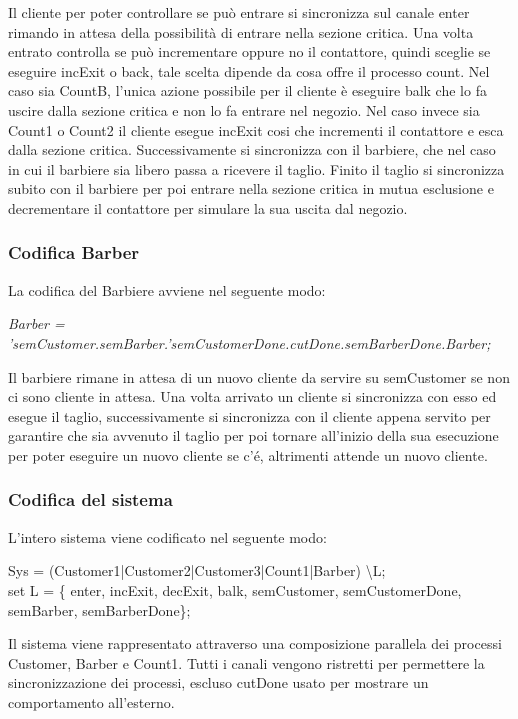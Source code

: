 Il cliente per poter controllare se può entrare si sincronizza sul canale enter rimando in attesa della possibilità di entrare nella sezione critica. Una volta entrato controlla se può incrementare oppure no il contattore, quindi sceglie se eseguire incExit o back, tale scelta dipende da cosa offre il processo count. Nel caso sia CountB, l'unica azione possibile per il cliente è eseguire balk che lo fa uscire dalla sezione critica e non lo fa entrare nel negozio. Nel caso invece sia Count1 o Count2 il cliente esegue incExit cosi che incrementi il contattore e esca dalla sezione critica. Successivamente si sincronizza con il barbiere, che nel caso in cui il barbiere sia libero passa a ricevere il taglio. Finito il taglio si sincronizza subito con il barbiere per poi entrare nella sezione critica in mutua esclusione e decrementare il contattore per simulare la sua uscita dal negozio.

\subsubsection{Codifica Barber}

La codifica del Barbiere avviene nel seguente modo:

\emph{Barber = 'semCustomer.semBarber.'semCustomerDone.cutDone.semBarberDone.Barber;}

Il barbiere rimane in attesa di un nuovo cliente da servire su semCustomer se non ci sono cliente in attesa. Una volta arrivato un cliente si sincronizza con esso ed esegue il taglio, successivamente si sincronizza con il cliente appena servito per garantire che sia avvenuto il taglio per poi tornare all'inizio della sua esecuzione per poter eseguire un nuovo cliente se c'é, altrimenti attende un nuovo cliente.

\subsubsection{Codifica del sistema}

L'intero sistema viene codificato nel seguente modo:

Sys = (Customer1|Customer2|Customer3|Count1|Barber) \textbackslash L;\\
set L = \{ enter, incExit, decExit, balk, semCustomer, semCustomerDone, semBarber, semBarberDone\};

Il sistema viene rappresentato attraverso una composizione parallela dei processi Customer, Barber e Count1. Tutti i canali vengono ristretti per permettere la sincronizzazione dei processi, escluso cutDone usato per mostrare un comportamento all'esterno.

